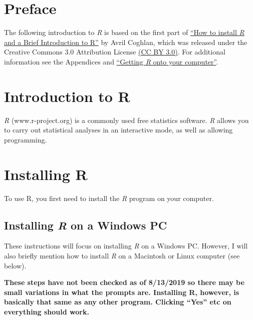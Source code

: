 \documentclass[
]{book}
\begin{document}
\hypertarget{preface}{%
\section{Preface}\label{preface}}

The following introduction to \emph{R} is based on the first part of \href{https://a-little-book-of-r-for-bioinformatics.readthedocs.io/en/latest/src/installr.html}{``How to install \emph{R} and a Brief Introduction to R''} by Avril Coghlan, which was released under the Creative Commons 3.0 Attribution License \href{https://creativecommons.org/licenses/by/3.0/}{(CC BY 3.0)}. For additional information see the Appendices and \href{https://brouwern.github.io/BOOK_R_Ecological_Data_Science/getting-r-onto-your-computer.html}{``Getting \emph{R} onto your computer''}.

\hypertarget{introduction-to-r}{%
\section{Introduction to R}\label{introduction-to-r}}

\emph{R} (www.r-project.org) is a commonly used free statistics software. \emph{R} allows you to carry out statistical analyses in an interactive mode, as well as allowing programming.

\hypertarget{installing-r}{%
\section{Installing R}\label{installing-r}}

To use R, you first need to install the \emph{R} program on your computer.

\hypertarget{installing-r-on-a-windows-pc}{%
\subsection{\texorpdfstring{Installing \emph{R} on a Windows PC}{Installing R on a Windows PC}}\label{installing-r-on-a-windows-pc}}

These instructions will focus on installing \emph{R} on a Windows PC. However, I will also briefly mention how to install \emph{R} on a Macintosh or Linux computer (see below).

\textbf{These steps have not been checked as of 8/13/2019 so there may be small variations in what the prompts are. Installing R, however, is basically that same as any other program. Clicking ``Yes'' etc on everything should work.}
\end{document}
